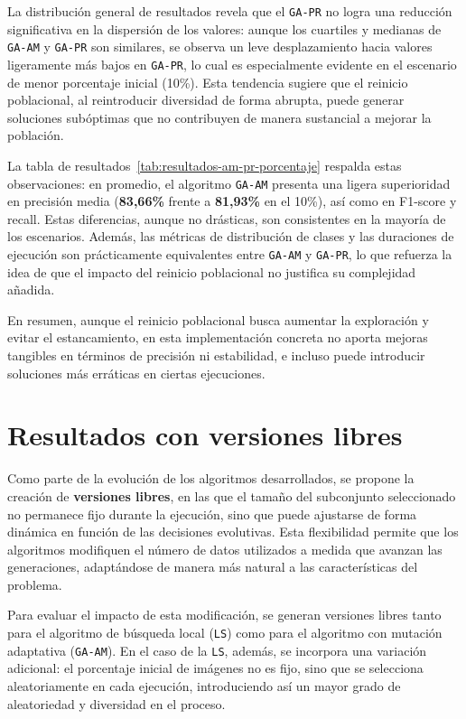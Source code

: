 La distribución general de resultados revela que el \texttt{GA-PR} no logra una reducción significativa en la dispersión de los valores:
aunque los cuartiles y medianas de \texttt{GA-AM} y \texttt{GA-PR} son similares, se observa un leve desplazamiento hacia valores ligeramente más bajos en \texttt{GA-PR},
lo cual es especialmente evidente en el escenario de menor porcentaje inicial (10\%).
Esta tendencia sugiere que el reinicio poblacional, al reintroducir diversidad de forma abrupta,
puede generar soluciones subóptimas que no contribuyen de manera sustancial a mejorar la población.

La tabla de resultados~\ref{tab:resultados-am-pr-porcentaje} respalda estas observaciones: en promedio,
el algoritmo \texttt{GA-AM} presenta una ligera superioridad en precisión media (\textbf{83,66\%} frente a \textbf{81,93\%} en el 10\%), así como en F1-score y recall.
Estas diferencias, aunque no drásticas, son consistentes en la mayoría de los escenarios.
Además, las métricas de distribución de clases y las duraciones de ejecución son prácticamente equivalentes entre \texttt{GA-AM} y \texttt{GA-PR},
lo que refuerza la idea de que el impacto del reinicio poblacional no justifica su complejidad añadida.

En resumen, aunque el reinicio poblacional busca aumentar la exploración y evitar el estancamiento,
en esta implementación concreta no aporta mejoras tangibles en términos de precisión ni estabilidad,
e incluso puede introducir soluciones más erráticas en ciertas ejecuciones.

\section{Resultados con versiones libres}\label{sec:resultados-versiones-libres}
Como parte de la evolución de los algoritmos desarrollados, se propone la creación de \textbf{versiones libres},
en las que el tamaño del subconjunto seleccionado no permanece fijo durante la ejecución, sino que puede ajustarse de forma dinámica en función de las decisiones evolutivas.
Esta flexibilidad permite que los algoritmos modifiquen el número de datos utilizados a medida que avanzan las generaciones,
adaptándose de manera más natural a las características del problema.

Para evaluar el impacto de esta modificación, se generan versiones libres tanto para el algoritmo de búsqueda local (\texttt{LS})
como para el algoritmo con mutación adaptativa (\texttt{GA-AM}).
En el caso de la \texttt{LS}, además, se incorpora una variación adicional: el porcentaje inicial de imágenes no es fijo,
sino que se selecciona aleatoriamente en cada ejecución, introduciendo así un mayor grado de aleatoriedad y diversidad en el proceso.


